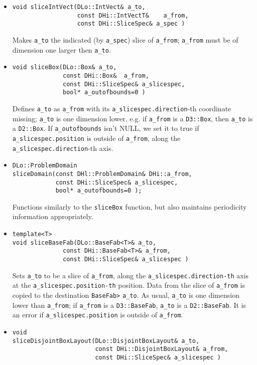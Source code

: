 \begin{itemize}
\item
\begin{verbatim}
void sliceIntVect(DLo::IntVect& a_to,
                  const DHi::IntVectT&    a_from,
                  const DHi::SliceSpec& a_spec )
\end{verbatim}
Makes \verb/a_to/ the indicated (by \verb/a_spec/) slice of
\verb/a_from/; \verb/a_from/ must be of dimension one larger then
\verb/a_to/. 


\item 
\begin{verbatim}
void sliceBox(DLo::Box& a_to,
              const DHi::Box&  a_from,
              const DHi::SliceSpec& a_slicespec,
              bool* a_outofbounds=0 )
\end{verbatim}
Defines \verb/a_to/ as \verb/a_from/ with its
\verb/a_slicespec.direction/-th coordinate missing;  
\verb/a_to/ is one dimension lower, e.g. if \verb/a_from/ is a
\verb/D3::Box/, then \verb/a_to/ is a \verb/D2::Box/.
If \verb/a_outofbounds/ isn't NULL, we set it to true if
\verb/a_slicespec.position/ is outside of \verb/a_from/, along the
\verb/a_slicespec.direction/-th axis. 

\item
\begin{verbatim}
DLo::ProblemDomain
sliceDomain(const DHl::ProblemDomain& DHi::a_from,
            const DHi::SliceSpec& a_slicespec,
            bool* a_outofbounds=0 );
\end{verbatim}
Functions similarly to the {\tt sliceBox} function, but also maintains
periodicity information appropriately.

\item
\begin{verbatim}
template<T>
void sliceBaseFab(DLo::BaseFab<T>& a_to,
              const DHi::BaseFab<T>& a_from,
              const DHi::SliceSpec& a_slicespec )
\end{verbatim}
Sets \verb/a_to/ to be a slice of \verb/a_from/, along the
\verb/a_slicespec.direction-th/ axis at the
\verb/a_slicespec.position-th/ position. Data from the slice of
\verb/a_from/ is copied to the destination {\tt BaseFab>}
\verb/a_to/. As usual, \verb/a_to/ is one dimension lower than
\verb/a_from/; if \verb/a_from/ is a \verb/D3::BaseFab/, \verb/a_to/
is a \verb/D2::BaseFab/. It is an error if
\verb/a_slicespec.position/ is outside of \verb/a_from/. 

\item
\begin{verbatim}
void
sliceDisjointBoxLayout(DLo::DisjointBoxLayout& a_to,
                       const DHi::DisjointBoxLayout& a_from,
                       const DHi::SliceSpec& a_slicespec )
\end{verbatim}





\end{itemize}
